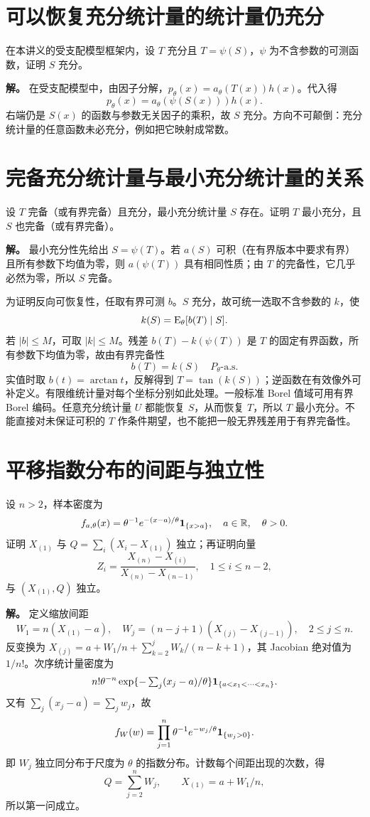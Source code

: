 \section{可以恢复充分统计量的统计量仍充分}
在本讲义的受支配模型框架内，设 $T$ 充分且 $T=\psi(S)$，$\psi$ 为不含参数的可测函数，证明 $S$ 充分。

\textbf{解。} 在受支配模型中，由因子分解，$p_\theta(x)=a_\theta(T(x))h(x)$。代入得
\[
 p_\theta(x)=a_\theta(\psi(S(x)))h(x).
\]
右端仍是 $S(x)$ 的函数与参数无关因子的乘积，故 $S$ 充分。方向不可颠倒：充分统计量的任意函数未必充分，例如把它映射成常数。

\section{完备充分统计量与最小充分统计量的关系}
设 $T$ 完备（或有界完备）且充分，最小充分统计量 $S$ 存在。证明 $T$ 最小充分，且 $S$ 也完备（或有界完备）。

\textbf{解。} 最小充分性先给出 $S=\psi(T)$。若 $a(S)$ 可积（在有界版本中要求有界）且所有参数下均值为零，则 $a(\psi(T))$ 具有相同性质；由 $T$ 的完备性，它几乎必然为零，所以 $S$ 完备。

为证明反向可恢复性，任取有界可测 $b$。$S$ 充分，故可统一选取不含参数的 $k$，使
\[
 k(S)=\operatorname{E}_\theta[b(T)\mid S].
\]
若 $|b|\le M$，可取 $|k|\le M$。残差 $b(T)-k(\psi(T))$ 是 $T$ 的固定有界函数，所有参数下均值为零，故由有界完备性
\[
 b(T)=k(S)\quad P_\theta\text{-a.s.}
\]
实值时取 $b(t)=\arctan t$，反解得到 $T=\tan(k(S))$；逆函数在有效像外可补定义。有限维统计量对每个坐标分别如此处理。一般标准 Borel 值域可用有界 Borel 编码。任意充分统计量 $U$ 都能恢复 $S$，从而恢复 $T$，所以 $T$ 最小充分。不能直接对未保证可积的 $T$ 作条件期望，也不能把一般无界残差用于有界完备性。

\section{平移指数分布的间距与独立性}
设 $n>2$，样本密度为
\[
 f_{a,\theta}(x)=\theta^{-1}e^{-(x-a)/\theta}\mathbf 1_{\{x>a\}},
 \quad a\in\mathbb R,\quad\theta>0.
\]
证明 $X_{(1)}$ 与 $Q=\sum_i(X_i-X_{(1)})$ 独立；再证明向量
\[
 Z_i=\frac{X_{(n)}-X_{(i)}}{X_{(n)}-X_{(n-1)}},\quad 1\le i\le n-2,
\]
与 $(X_{(1)},Q)$ 独立。

\textbf{解。} 定义缩放间距
\[
 W_1=n(X_{(1)}-a),\quad
 W_j=(n-j+1)(X_{(j)}-X_{(j-1)}),\quad 2\le j\le n.
\]
反变换为 $X_{(j)}=a+W_1/n+\sum_{k=2}^jW_k/(n-k+1)$，其 Jacobian 绝对值为 $1/n!$。次序统计量密度为
\[
 n!\theta^{-n}\exp\{-\textstyle\sum_j(x_j-a)/\theta\}
 \mathbf 1_{\{a<x_1<\cdots<x_n\}}.
\]
又有 $\sum_j(x_j-a)=\sum_jw_j$，故
\[
 f_W(w)=\prod_{j=1}^n\theta^{-1}e^{-w_j/\theta}\mathbf 1_{\{w_j>0\}}.
\]
即 $W_j$ 独立同分布于尺度为 $\theta$ 的指数分布。计数每个间距出现的次数，得
\[
 Q=\sum_{j=2}^nW_j,\qquad X_{(1)}=a+W_1/n,
\]
所以第一问成立。

